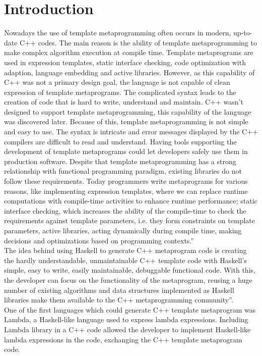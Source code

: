 \documentclass{article}
\begin{document}
\section{Introduction}
Nowadays the use of template metaprogramming often occurs in modern, up-to-date C++ codes. The main reason is the ability of template metaprogramming to make complex algorithm execution at compile time. Template metaprograms are used in expression templates, static interface checking, code optimization with adaption, language embedding and active libraries. However, as this capability of C++ was not a primary design goal, the language is not capable of clean expression of template metaprograms. The complicated syntax leads to the creation of code that
is hard to write, understand and maintain. C++ wasn’t designed to support template metaprogramming, this capability of the language was discovered
later. Because of this, template metaprogramming is not simple
and easy to use. The syntax is intricate and error messages
displayed by the C++ compilers are difficult to read and understand.
Having tools supporting the development of template metaprograms
could let developers safely use them in production software. Despite that template metaprogramming has a strong relationship with functional programming paradigm, existing libraries do not follow these requirements. Today programmers write metaprograms for various reasons,
like implementing expression templates, where we can replace
runtime computations with compile-time activities to enhance runtime performance; static interface checking, which increases the
ability of the compile-time to check the requirements against template parameters, i.e. they form constraints on template parameters, active libraries, acting dynamically during compile time, making decisions and optimizations based on programming
contexts.'' \cite{porkolab2009c++}  \\
The idea behind using Haskell to generate C++ metaprogram code is creating the hardly understandable, unmaintainable C++ template code with Haskell's simple, easy to write, easily maintainable, debuggable functional code. With this, the developer can focus on the
functionality of the metaprogram, reusing a huge number of existing algorithms and data structures implemented as Haskell libraries make them available to the C++ metaprogramming community''. \cite{porkolab2009functional}  \\
One of the first languages which could generate C++ template metaprogram was Lambda, a Haskell-like language used to express lambda expressions. Including Lambda library in a C++ code allowed the developer to implement Haskell-like lambda expressions in the code, exchanging the C++ template metaprogram code.
\end{document}
